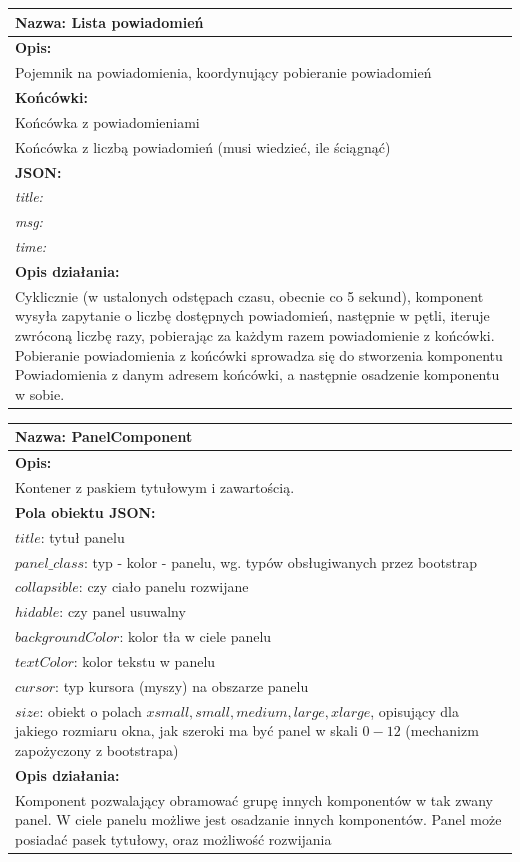\documentclass[licencjacka]{pracamgr}
\begin{document}
\begin{tabularx}{\linewidth}{|X|}\hline
\textbf{Nazwa:}
Lista powiadomień
\\\hline
\textbf{Opis:}\\

Pojemnik na powiadomienia, koordynujący pobieranie powiadomień\\\hline
\textbf{Końcówki:}\\
Końcówka z powiadomieniami\\
Końcówka z liczbą powiadomień (musi wiedzieć, ile ściągnąć)
\\\hline
\textbf{JSON:}\\
\textit{title:}\\
\textit{msg:}\\
\textit{time:} \\ \hline
\textbf{Opis działania:}\\
Cyklicznie (w ustalonych odstępach czasu, obecnie co 5 sekund), komponent
wysyła zapytanie o liczbę dostępnych powiadomień, następnie w pętli, iteruje zwróconą liczbę razy,
pobierając za każdym razem powiadomienie z końcówki. Pobieranie powiadomienia z końcówki sprowadza się
do stworzenia komponentu Powiadomienia z danym adresem końcówki, a następnie osadzenie komponentu w sobie.\\\hline
\end{tabularx}


\begin{tabularx}{\linewidth}{|X|}\hline
\textbf{Nazwa:}
PanelComponent
\\\hline
\textbf{Opis:}\\
Kontener z paskiem tytułowym i zawartością.\\
\hline
\textbf{Pola obiektu JSON:} \\
$title$: tytuł panelu\\
$panel\_class$: typ - kolor - panelu, wg. typów obsługiwanych przez bootstrap\\
$collapsible$: czy ciało panelu rozwijane\\
$hidable$: czy panel usuwalny\\
$backgroundColor$: kolor tła w ciele panelu\\
$textColor$: kolor tekstu w panelu\\
$cursor$: typ kursora (myszy) na obszarze panelu\\
$size$: obiekt o polach $xsmall, small, medium, large, xlarge$, opisujący dla jakiego rozmiaru okna, jak szeroki ma być panel w skali $0 - 12$ (mechanizm zapożyczony z bootstrapa)
\\\hline
\textbf{Opis działania:}\\
Komponent pozwalający obramować grupę innych komponentów w tak zwany panel.
W ciele panelu możliwe jest osadzanie innych komponentów. Panel może posiadać pasek tytułowy, oraz możliwość rozwijania\\\hline

\end{tabularx}
\end{document}
